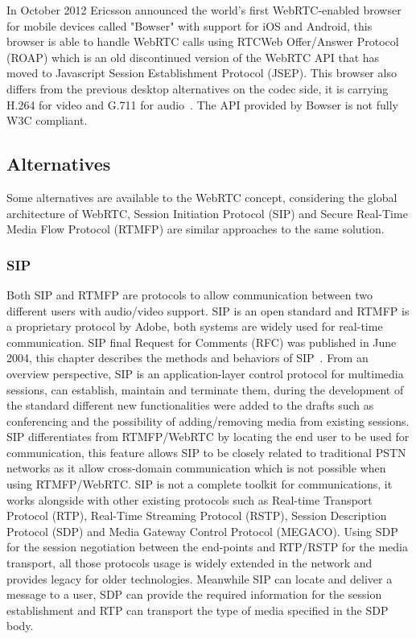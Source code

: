 In October 2012 Ericsson announced the world's first WebRTC-enabled browser for mobile devices called "Bowser" with support for iOS and Android, this browser is able to handle WebRTC calls using RTCWeb Offer/Answer Protocol (ROAP) which is an old discontinued version of the WebRTC API that has moved to Javascript Session Establishment Protocol (JSEP). This browser also differs from the previous desktop alternatives on the codec side, it is carrying H.264 for video and G.711 for audio~\cite{ericssonbowser}. The API provided by Bowser is not fully W3C compliant.

\subsection{Alternatives}

Some alternatives are available to the WebRTC concept, considering the global architecture of WebRTC, Session Initiation Protocol (SIP) and Secure Real-Time Media Flow Protocol (RTMFP) are similar approaches to the same solution.

\subsubsection{SIP}

Both SIP and RTMFP are protocols to allow communication between two different users with audio/video support. SIP is an open standard and RTMFP is a proprietary protocol by Adobe, both systems are widely used for real-time communication. SIP final Request for Comments (RFC) was published in June 2004, this chapter describes the methods and behaviors of SIP~\cite{sipRFC}. From an overview perspective, SIP is an application-layer control protocol for multimedia sessions, can establish, maintain and terminate them, during the development of the standard different new functionalities were added to the drafts such as conferencing and the possibility of adding/removing media from existing sessions. SIP differentiates from RTMFP/WebRTC by locating the end user to be used for communication, this feature allows SIP to be closely related to traditional PSTN networks as it allow cross-domain communication which is not possible when using RTMFP/WebRTC. SIP is not a complete toolkit for communications, it works alongside with other existing protocols such as Real-time Transport Protocol (RTP), Real-Time Streaming Protocol (RSTP), Session Description Protocol (SDP) and Media Gateway Control Protocol (MEGACO). Using SDP for the session negotiation between the end-points and RTP/RSTP for the media transport, all those protocols usage is widely extended in the network and provides legacy for older technologies. Meanwhile SIP can locate and deliver a message to a user, SDP can provide the required information for the session establishment and RTP can transport the type of media specified in the SDP body.

